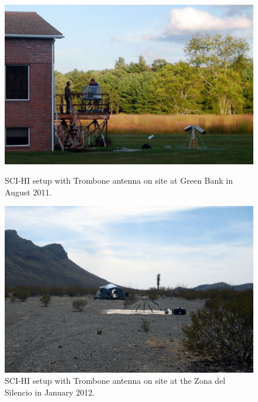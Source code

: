 \begin{figure}[htb]
\centering
\begin{minipage}[b]{0.48\textwidth}
\centering
\includegraphics[width=0.95\linewidth]{SCIHI_system/figures/trombone_gbt.jpg}
\caption{SCI-HI setup with Trombone antenna on site at Green Bank in August 2011.}
\label{Fig:trombone_gbt}
\end{minipage}%
\begin{minipage}[b]{0.02\textwidth}
\hspace{1cm}
\end{minipage}%
\begin{minipage}[b]{0.46\textwidth}
\centering
\includegraphics[width=0.95\linewidth]{SCIHI_system/figures/trombone_sys_ZdS.jpg}
\caption{SCI-HI setup with Trombone antenna on site at the Zona del Silencio in January 2012.}
\label{Fig:trombone_zds}
\end{minipage}
\end{figure}

